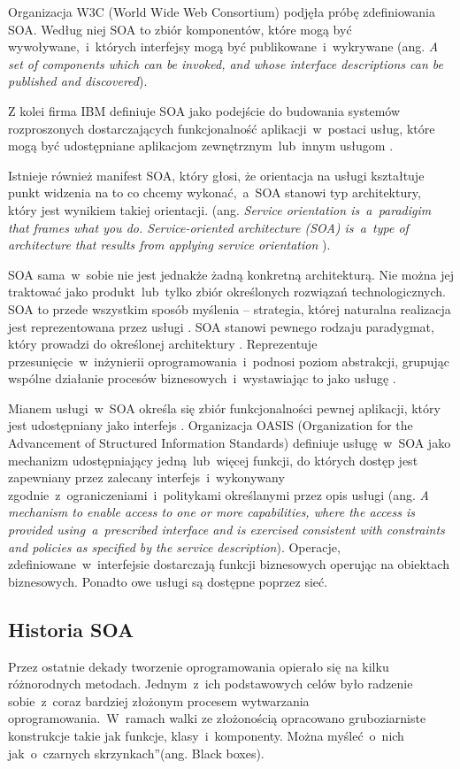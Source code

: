 Organizacja W3C (World Wide Web Consortium) podjęła próbę zdefiniowania SOA. Według niej SOA to zbiór komponentów, które mogą być wywoływane,~i~których interfejsy mogą być publikowane~i~wykrywane (ang. \emph{A set of components which can be invoked, and whose interface descriptions can be published and discovered}).

Z kolei firma IBM definiuje SOA jako podejście do budowania systemów rozproszonych dostarczających funkcjonalność aplikacji~w~postaci usług, które mogą być udostępniane aplikacjom zewnętrznym~lub~innym usługom \cite{PlatIntGor}.

Istnieje również manifest SOA, który głosi, że orientacja na usługi kształtuje punkt widzenia na to co chcemy wykonać,~a~SOA stanowi typ architektury, który jest wynikiem takiej orientacji. (ang. \emph{Service orientation is~a~paradigim that frames what you do. Service-oriented architecture (SOA) is~a~type of architecture that results from applying service orientation} \cite{SOAManifestoOrg}). 

SOA sama~w~sobie nie jest jednakże żadną konkretną architekturą. Nie można jej traktować jako produkt~lub~tylko zbiór określonych rozwiązań technologicznych. SOA to przede wszystkim sposób myślenia – strategia, której naturalna realizacja jest reprezentowana przez usługi \cite{SOAsdj102009,SOAwJBBC}. SOA stanowi pewnego rodzaju paradygmat, który prowadzi do określonej architektury \cite{SOAsdj102009}. Reprezentuje przesunięcie~w~inżynierii oprogramowania~i~podnosi poziom abstrakcji, grupując wspólne działanie procesów biznesowych~i~wystawiając to jako usługę \cite{CompSOAMet}.
	
Mianem usługi~w~SOA określa się zbiór funkcjonalności pewnej aplikacji, który jest udostępniany jako interfejs \cite{SOAawidptas}. Organizacja OASIS (Organization for the Advancement of Structured Information Standards) definiuje usługę~w~SOA jako mechanizm udostępniający jedną~lub~więcej funkcji, do których dostęp jest zapewniany przez zalecany interfejs~i~wykonywany zgodnie~z~ograniczeniami~i~politykami określanymi przez opis usługi (ang. \emph{A mechanism to enable access to one or more capabilities, where the access is provided using~a~prescribed interface and is exercised consistent with constraints and policies as specified by the service description}). Operacje, zdefiniowane~w~interfejsie dostarczają funkcji biznesowych operując na obiektach biznesowych. Ponadto owe usługi są dostępne poprzez sieć.

\subsection{Historia SOA}
Przez ostatnie dekady tworzenie oprogramowania opierało się na kilku różnorodnych metodach. Jednym~z~ich podstawowych celów było radzenie sobie~z~coraz bardziej złożonym procesem wytwarzania oprogramowania.~W~ramach walki ze złożonością opracowano gruboziarniste konstrukcje takie jak funkcje, klasy~i~komponenty. Można myśleć~o~nich jak~o~\quotedblbase czarnych skrzynkach\textquotedblright (ang. Black boxes). 

